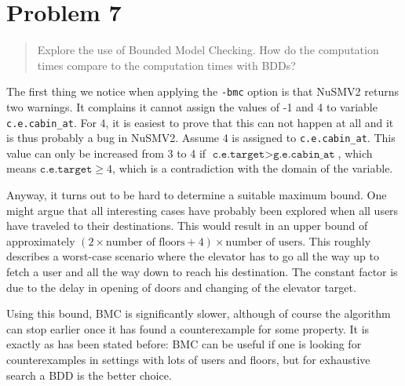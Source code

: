 \documentclass[a4paper,10pt]{article}
\begin{document}
	\section{Problem 7}
	
	\begin{quote}
		Explore the use of Bounded Model Checking. How do the computation times compare to the computation times with BDDs?
	\end{quote}

	
	The first thing we notice when applying the \texttt{-bmc} option is that NuSMV2 returns two warnings. It complains it cannot assign the values of -1 and 4 to variable \texttt{c.e.cabin\_at}. For 4, it is easiest to prove that this can not happen at all and it is thus probably a bug in NuSMV2. Assume 4 is assigned to \texttt{c.e.cabin\_at}. This value can only be increased from 3 to 4 if \(\texttt{c.e.target} > \texttt{g.e.cabin\_at}\), which means \(\texttt{c.e.target} \ge 4\), which is a contradiction with the domain of the variable.
	
	Anyway, it turns out to be hard to determine a suitable maximum bound. One might argue that all interesting cases have probably been explored when all users have traveled to their destinations. This would result in an upper bound of approximately \((2 \times \textrm{number of floors} + 4) \times \textrm{number of users}\). This roughly describes a worst-case scenario where the elevator has to go all the way up to fetch a user and all the way down to reach his destination. The constant factor is due to the delay in opening of doors and changing of the elevator target.
	
	Using this bound, BMC is significantly slower, although of course the algorithm can stop earlier once it has found a counterexample for some property. It is exactly as has been stated before: BMC can be useful if one is looking for counterexamples in settings with lots of users and floors, but for exhaustive search a BDD is the better choice.
\end{document}
